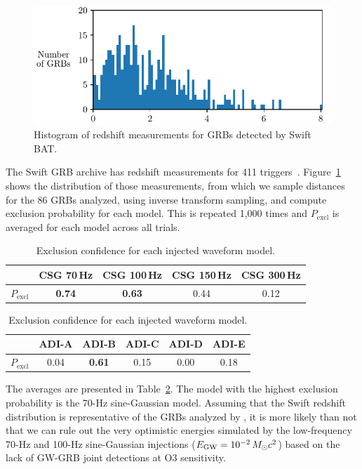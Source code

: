 \begin{figure}[h]
  \centering
  \includegraphics{figures/grb/redshifts.pdf}
  \caption{Histogram of redshift measurements for GRBs detected by Swift BAT.}
  \label{fig:grb-o3b-redshifts}
\end{figure}

The Swift GRB archive has redshift measurements for 411 triggers~\citep{swift_archive}.
Figure~\ref{fig:grb-o3b-redshifts} shows the distribution of those measurements, from which we sample distances for the 86 GRBs analyzed, using inverse transform sampling, and compute exclusion probability for each model.
This is repeated 1,000 times and $P_{\text{excl}}$ is averaged for each model across all trials.

\begin{table}[h]
  \hspace{0.5cm}
  \caption
  {\label{tab:grb-o3b-model-exclusion} Exclusion confidence for each injected waveform model.}
  \begin{tabular}{c c c c c}
    \hline
    \hline
    \rule{0pt}{4ex}
    & CSG 70\,Hz & CSG 100\,Hz & CSG 150\,Hz & CSG 300\,Hz \\
    \hline
    \rule[-2ex]{0pt}{4ex}
		$P_{\text{excl}}$ & \textbf{0.74} & \textbf{0.63} & 0.44 & 0.12
  \end{tabular}
  \begin{tabular}{c c c c c c}
    \hline
    \hline
    \rule{0pt}{4ex}
    & ADI-A & ADI-B & ADI-C & ADI-D & ADI-E \\
    \hline
    \rule[-2ex]{0pt}{4ex}
    $P_{\text{excl}}$ & 0.04 & \textbf{0.61} & 0.15 & 0.00 & 0.18 \\
    \hline
  \end{tabular}
\end{table}

The averages are presented in Table~\ref{tab:grb-o3b-model-exclusion}.
The model with the highest exclusion probability is the 70-Hz sine-Gaussian model.
Assuming that the Swift redshift distribution is representative of the GRBs analyzed by \xpip, it is more likely than not that we can rule out the very optimistic energies simulated by the low-frequency 70-Hz and 100-Hz sine-Gaussian injections ($E_{\text{GW}} = 10^{-2}\,M_{\odot} c^2$) based on the lack of GW-GRB joint detections at O3 sensitivity.

